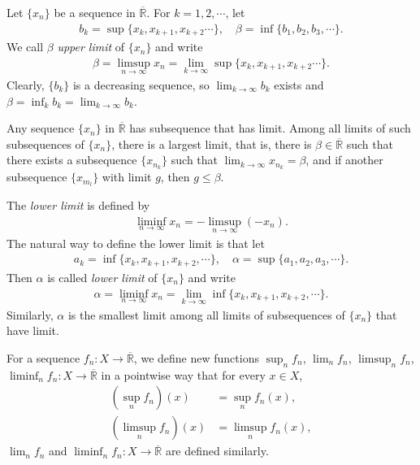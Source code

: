 \documentclass[11pt]{book}
\theoremstyle{definition}
\numberwithin{equation}{chapter}
\begin{document}
\medskip

Let $\{x_n\}$ be a sequence in $\overline{\mathbb{R}}$. For $k = 1,2,\cdots$, let
\begin{align*}
    b_k = \sup \{x_k,x_{k+1},x_{k+2}\cdots\}, \quad \beta = \inf \{b_1,b_2,b_3,\cdots\}.
\end{align*}
We call $\beta$ {\em upper limit} of $\{x_n\}$ and write
\begin{align*}
    \beta = \limsup_{n\to\infty} x_n = \lim_{k\to\infty} \sup\{x_k, x_{k+1}, x_{k+2}\cdots\}.
\end{align*}
Clearly, $\{b_k\}$ is a decreasing sequence, so $\lim_{k\to\infty} b_k$ exists and $\beta = \inf_k b_k = \lim_{k\to\infty} b_k$.

Any sequence $\{x_n\}$ in $\overline{\mathbb{R}}$ has subsequence that has limit. Among all limits of such subsequences of $\{x_n\}$, there is a largest limit, that is, there is $\beta \in \overline{\mathbb{R}}$ such that there exists a subsequence $\{x_{n_k}\}$ such that $\lim_{k\to\infty} x_{n_k} = \beta$, and if another subsequence $\{x_{m_l}\}$ with limit $g$, then $g \leq \beta$.

The {\em lower limit} is defined by 
\begin{align*}
    \liminf_{n\to\infty} x_n = - \limsup_{n\to\infty} (-x_n).
\end{align*}
The natural way to define the lower limit is that let
\begin{align*}
    a_k = \inf\{x_k,x_{k+1},x_{k+2},\cdots\}, \quad \alpha = \sup \{a_1,a_2,a_3,\cdots\}.
\end{align*}
Then $\alpha$ is called {\em lower limit} of $\{x_n\}$ and write
\begin{align*}
    \alpha = \liminf_{n\to\infty} x_n = \lim_{k\to\infty} \inf \{x_k,x_{k+1},x_{k+2},\cdots\}.
\end{align*}
Similarly, $\alpha$ is the smallest limit among all limits of subsequences of $\{x_n\}$ that have limit.

For a sequence $f_n:X \to \overline{\mathbb{R}}$, we define new functions $\sup_n f_n$, $\lim_n f_n$, $\limsup_n f_n$, $\liminf_n f_n: X \to \overline{\mathbb{R}}$ in a pointwise way that for every $x \in X$,
\begin{align*}
    \left(\sup_n f_n\right)(x) & = \sup_n f_n(x),\\
    \left(\limsup_n f_n\right)(x) & = \limsup_n f_n(x),
\end{align*}
$\lim_n f_n$ and $\liminf_n f_n: X \to \overline{\mathbb{R}}$ are defined similarly.
\end{document}
